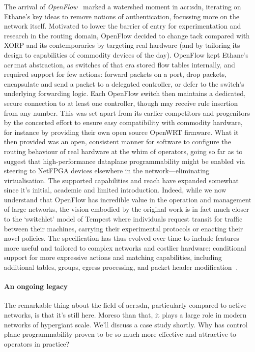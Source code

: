 The arrival of \emph{OpenFlow}~\parencite{DBLP:journals/ccr/McKeownABPPRST08} marked a watershed moment in \gls{acr:sdn}, iterating on Ethane's key ideas to remove notions of authentication, focussing more on the network itself.
Motivated to lower the barrier of entry for experimentation and research in the routing domain, OpenFlow decided to change tack compared with XORP and its contemporaries by targeting real hardware (and by tailoring its design to capabilities of commodity devices of the day).
OpenFlow kept Ethane's \gls{acr:mat} abstraction, as switches of that era stored flow tables internally, and required support for few actions: forward packets on a port, drop packets, encapsulate and send a packet to a delegated controller, or defer to the switch's underlying forwarding logic.
Each OpenFlow switch then maintains a dedicated, secure connection to at least one controller, though may receive rule insertion from any number.
This was set apart from its earlier competitors and progenitors by the concerted effort to ensure easy compatibility with commodity hardware, for instance by providing their own open source OpenWRT firmware.
What it then provided was an open, consistent manner for software to configure the routing behaviour of real hardware at the whim of operators, going so far as to suggest that high-performance dataplane programmability might be enabled via steering to NetFPGA devices elsewhere in the network---eliminating virtualisation.
The supported capabilities and reach have expanded somewhat since it's initial, academic and limited introduction.
Indeed, while we now understand that OpenFlow has incredible value in the operation and management of large networks, the vision embodied by the original work is in fact much closer to the `switchlet' model of Tempest where individuals request transit for traffic between their machines, carrying their experimental protocols or enacting their novel policies.
The specification has thus evolved over time to include features more useful and tailored to complex networks and costlier hardware: conditional support for more expressive actions and matching capabilities, including additional tables, groups, egress processing, and packet header modification~\parencite{openflow-1-5}.

\paragraph{An ongoing legacy}
The remarkable thing about the field of \gls{acr:sdn}, particularly compared to active networks, is that it's still here.
Moreso than that, it plays a large role in modern networks of hypergiant scale. 
We'll discuss a case study shortly.
Why has control plane programmability proven to be so much more effective and attractive to operators in practice?

